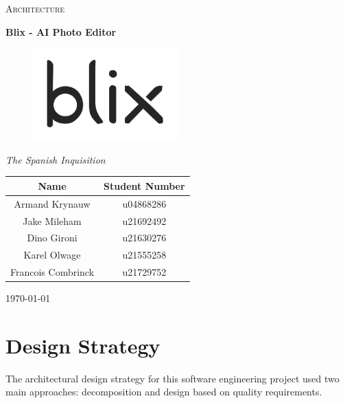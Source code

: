 \documentclass[11pt,a4paper]{article}
\begin{document}
\begin{titlepage}
	\centering
    {\scshape\LARGE Architecture\par}
    \vspace{1.5cm}
    {\huge\bfseries Blix - AI Photo Editor\par}
    \begin{figure}[h]
        \centering %
        \includegraphics[width=0.5\textwidth]{../pics/blix.png}
    \end{figure}
    \vspace{2.5cm}
    {\Large\itshape The Spanish Inquisition\par}
	\begin{tabular}{|c|c|}
		\hline
		\textbf{Name} 		& \textbf{Student Number} \\
		\hline
		Armand Krynauw		& u04868286  \\
		Jake Mileham		& u21692492  \\
		Dino Gironi			& u21630276  \\
		Karel Olwage		& u21555258  \\
		Francois Combrinck	& u21729752  \\
		\hline
	\end{tabular}
    \vfill
    {\large \today\par}
\end{titlepage}

\tableofcontents
\pagebreak


\section{Design Strategy}
The architectural design strategy for this software engineering project used two
main approaches: decomposition and design based on quality requirements.
\end{document}
